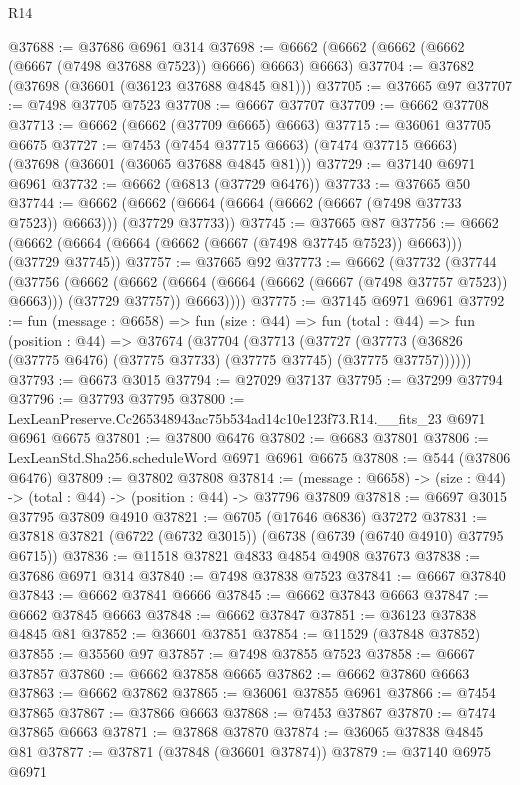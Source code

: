 \begin{lexlean}{R14}
\begin{coremodule}
@37688 := @37686 @6961 @314
@37698 := @6662 (@6662 (@6662 (@6662 (@6667 (@7498 @37688 @7523)) @6666) @6663) @6663)
@37704 := @37682 (@37698 (@36601 (@36123 @37688 @4845 @81)))
@37705 := @37665 @97
@37707 := @7498 @37705 @7523
@37708 := @6667 @37707
@37709 := @6662 @37708
@37713 := @6662 (@6662 (@37709 @6665) @6663)
@37715 := @36061 @37705 @6675
@37727 := @7453
    (@7454 @37715 @6663)
    (@7474 @37715 @6663)
    (@37698 (@36601 (@36065 @37688 @4845 @81)))
@37729 := @37140 @6971 @6961
@37732 := @6662 (@6813 (@37729 @6476))
@37733 := @37665 @50
@37744 := @6662 (@6662 (@6664 (@6664 (@6662 (@6667 (@7498 @37733 @7523)) @6663))) (@37729 @37733))
@37745 := @37665 @87
@37756 := @6662 (@6662 (@6664 (@6664 (@6662 (@6667 (@7498 @37745 @7523)) @6663))) (@37729 @37745))
@37757 := @37665 @92
@37773 := @6662
    (@37732
      (@37744
        (@37756
          (@6662
            (@6662 (@6664 (@6664 (@6662 (@6667 (@7498 @37757 @7523)) @6663))) (@37729 @37757))
            @6663))))
@37775 := @37145 @6971 @6961
@37792 := fun (message : @6658) =>
  fun (size : @44) =>
  fun (total : @44) =>
  fun (position : @44) =>
  @37674
    (@37704
      (@37713
        (@37727 (@37773 (@36826 (@37775 @6476) (@37775 @37733) (@37775 @37745) (@37775 @37757))))))
@37793 := @6673 @3015
@37794 := @27029 @37137
@37795 := @37299 @37794
@37796 := @37793 @37795
@37800 := LexLeanPreserve.Cc265348943ac75b534ad14c10e123f73.R14.__fits_23 @6971 @6961 @6675
@37801 := @37800 @6476
@37802 := @6683 @37801
@37806 := LexLeanStd.Sha256.scheduleWord @6971 @6961 @6675
@37808 := @544 (@37806 @6476)
@37809 := @37802 @37808
@37814 := (message : @6658) -> (size : @44) -> (total : @44) -> (position : @44) -> @37796 @37809
@37818 := @6697 @3015 @37795 @37809 @4910
@37821 := @6705 (@17646 @6836) @37272
@37831 := @37818 @37821 (@6722 (@6732 @3015)) (@6738 (@6739 (@6740 @4910) @37795 @6715))
@37836 := @11518 @37821 @4833 @4854 @4908 @37673
@37838 := @37686 @6971 @314
@37840 := @7498 @37838 @7523
@37841 := @6667 @37840
@37843 := @6662 @37841 @6666
@37845 := @6662 @37843 @6663
@37847 := @6662 @37845 @6663
@37848 := @6662 @37847
@37851 := @36123 @37838 @4845 @81
@37852 := @36601 @37851
@37854 := @11529 (@37848 @37852)
@37855 := @35560 @97
@37857 := @7498 @37855 @7523
@37858 := @6667 @37857
@37860 := @6662 @37858 @6665
@37862 := @6662 @37860 @6663
@37863 := @6662 @37862
@37865 := @36061 @37855 @6961
@37866 := @7454 @37865
@37867 := @37866 @6663
@37868 := @7453 @37867
@37870 := @7474 @37865 @6663
@37871 := @37868 @37870
@37874 := @36065 @37838 @4845 @81
@37877 := @37871 (@37848 (@36601 @37874))
@37879 := @37140 @6975 @6971

\end{coremodule}
\end{lexlean}
